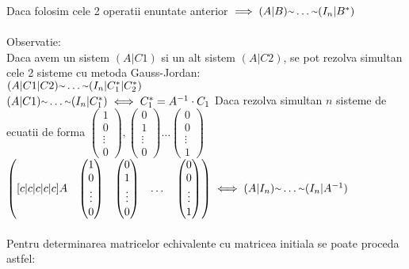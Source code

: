 \documentclass{article}
\newcommand{\mytilde}{\raise.17ex\hbox{$\scriptstyle\mathtt{\sim}$}}
\begin{document}
        Daca folosim cele 2 operatii enuntate anterior $\implies (A|B) \mytilde \dots \mytilde (I_n|B^*)$\\ \\
        Observatie:\\
        Daca avem un sistem $(A|C1)$ si un alt sistem $(A|C2)$, se pot rezolva simultan cele 2 sisteme cu metoda Gauss-Jordan:\\
        $(A|C1|C2)\mytilde \dots \mytilde (I_n|C_1^*|C_2^*)$\\
        $(A|C1) \mytilde \dots \mytilde (I_n|C_1^*) \iff C_1^* = A^{-1} \cdot C_1$
        Daca rezolva simultan $n$ sisteme de ecuatii de forma $\begin{pmatrix} 1\\0\\ \vdots\\ 0 \end{pmatrix}, \begin{pmatrix} 0\\1\\ \vdots\\ 0 \end{pmatrix}
            \dots \begin{pmatrix} 0\\0\\ \vdots\\ 1 \end{pmatrix}$\\
                $\begin{pmatrix}[c|c|c|c|c] A&\begin{pmatrix} 1\\0\\ \vdots\\ 0 \end{pmatrix}& \begin{pmatrix} 0\\1\\ \vdots\\ 0 \end{pmatrix}& \dots &
                    \begin{pmatrix}0\\0\\ \vdots\\ 1\end{pmatrix}\end{pmatrix} \iff (A|I_n) \mytilde \dots \mytilde (I_n|A^{-1})$ \\ \\
        Pentru determinarea matricelor echivalente cu matricea initiala se poate proceda astfel:
\end{document}
